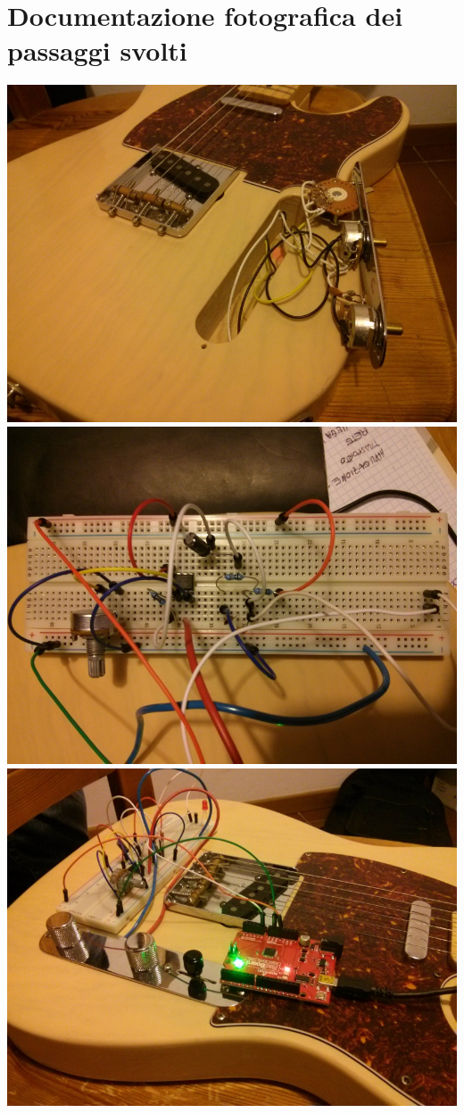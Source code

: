 \documentclass[a4paper,11pt]{article}
\begin{document}
\section{Documentazione fotografica dei passaggi svolti}
\includegraphics[width=\textwidth]{foto_1.jpg}
\includegraphics[width=\textwidth]{foto_2.jpg}
\includegraphics[width=\textwidth]{foto_3.jpg}
\end{document}
